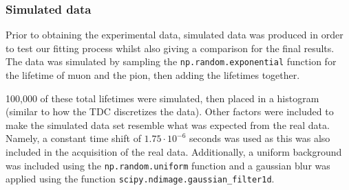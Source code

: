 \documentclass[11pt,a4paper]{article}
\begin{document}
\subsubsection{Simulated data}
Prior to obtaining the experimental data, simulated data was produced in order to test our fitting process whilst also giving a comparison for the final results. The data was simulated by sampling the \verb|np.random.exponential| function for the lifetime of muon and the pion, then adding the lifetimes together.

100,000 of these total lifetimes were simulated, then placed in a histogram (similar to how the TDC discretizes the data). Other factors were included to make the simulated data set resemble what was expected from the real data. Namely, a constant time shift of $1.75 \cdot 10^{-6}$ seconds was used as this was also included in the acquisition of the real data. Additionally, a uniform background was included using the \verb|np.random.uniform| function and a gaussian blur was applied using the function \verb|scipy.ndimage.gaussian_filter1d|.
\end{document}
